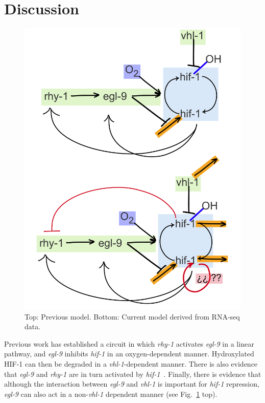 \documentclass[9pt,twocolumn,twoside]{pnas-new}
\newcommand{\egl}{\emph{egl-9}}
\newcommand{\rhy}{\emph{rhy-1}}
\newcommand{\vhl}{\emph{vhl-1}}
\newcommand{\hif}{\emph{hif-1}}
\newcommand{\hifp}{HIF-1}
\begin{document}
\section*{Discussion}
\begin{figure}[tbhp]
\centering
\includegraphics[width=\linewidth]{figs/new_model.pdf}
\caption{Top: Previous model. Bottom: Current model derived from RNA-seq data.}
\label{fig:newmodel}
\end{figure}

Previous work has established a circuit in which \rhy{} activates \egl{} in a linear pathway, and \egl{} inhibits \hif{} in an oxygen-dependent manner. Hydroxylated \hifp{} can then be degraded in a \vhl{}-dependent manner. There is also evidence that \egl{} and \rhy{} are in turn activated by \hif{}~\cite{Bishop2004,Powell-Coffman2010}.
Finally, there is evidence that although the interaction between \egl{} and \vhl{} is important for \hif{} repression, \egl{} can also act in a non-\vhl{} dependent manner (see Fig.~\ref{fig:newmodel} top).
\end{document}
